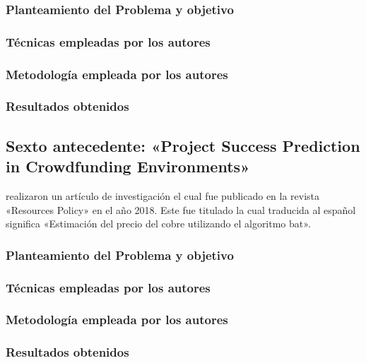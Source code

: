 \subsubsection{Planteamiento del Problema y objetivo }


\subsubsection{Técnicas empleadas por los autores}


\subsubsection{Metodología empleada por los autores}


\subsubsection{Resultados obtenidos}



\subsection{Sexto antecedente: «Project Success Prediction in Crowdfunding Environments» \citep*{pr_li2016predcrowd}}
\citeauthor{pr_li2016predcrowd} realizaron un artículo de investigación el cual fue publicado en la revista «Resources Policy» en el año 2018. Este fue titulado  la cual traducida al español significa «Estimación del precio del cobre utilizando el algoritmo bat».

\subsubsection{Planteamiento del Problema y objetivo }


\subsubsection{Técnicas empleadas por los autores}
 

\subsubsection{Metodología empleada por los autores}


\subsubsection{Resultados obtenidos}



